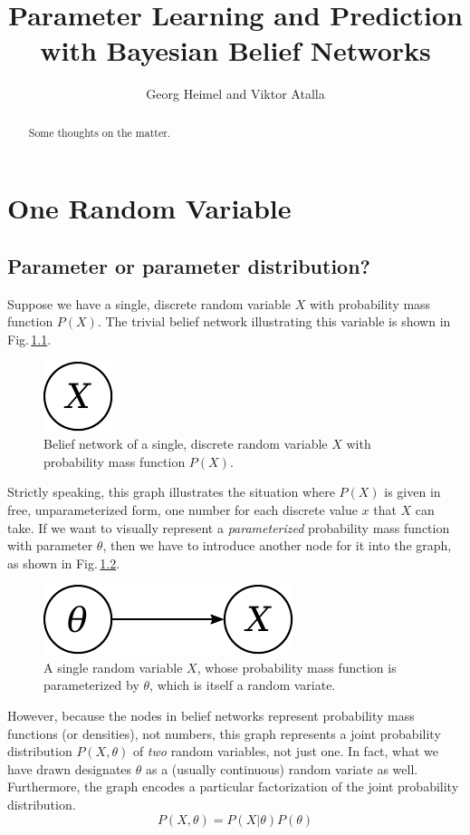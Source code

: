 \documentclass[]{report}
\title{Parameter Learning and Prediction with Bayesian Belief Networks}
\author{Georg Heimel and Viktor Atalla}
\begin{document}
\maketitle


\begin{abstract}
Some thoughts on the matter.
\end{abstract}


\chapter{One Random Variable} \label{chap:1var}
\section{Parameter or parameter distribution?} \label{sect:set_param}
Suppose we have a single, discrete random variable $X$ with probability mass function $P(X)$. The trivial belief network illustrating this variable is shown in Fig.\,\ref{fig:1var}.
\begin{figure}[h]
	\centering
	\includegraphics[scale=0.5]{1var}
	\caption{Belief network of a single, discrete random variable $X$ with probability mass function $P(X)$.}
	\label{fig:1var}
\end{figure}
Strictly speaking, this graph illustrates the situation where $P(X)$ is given in free, unparameterized form, one number for each discrete value $x$ that $X$ can take. If we want to visually represent a \emph{parameterized} probability mass function with parameter $\theta$, then we have to introduce another node for it into the graph, as shown in Fig.\,\ref{fig:1var1param}.
\begin{figure}[h]
	\centering
	\includegraphics[scale=0.5]{1var_1param}
	\caption{A single random variable $X$, whose probability mass function is parameterized by $\theta$, which is itself a random variate.}
	\label{fig:1var1param}
\end{figure}
However, because the nodes in belief networks represent probability mass functions (or densities), not numbers, this graph represents a joint probability distribution $P(X, \theta ) $ of \emph{two} random variables, not just one. In fact, what we have drawn designates $\theta$ as a (usually continuous) random variate as well. Furthermore, the graph encodes a particular factorization of the joint probability distribution.
\begin{equation}
P( X, \theta)
=
P( X | \theta )
P( \theta )
\end{equation}
\end{document}

